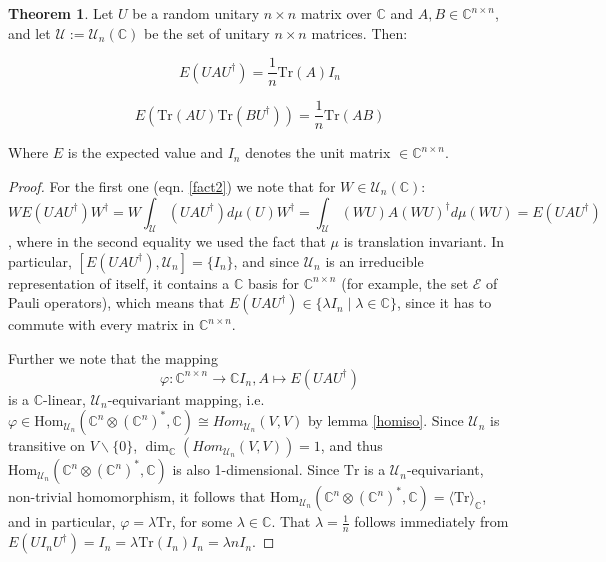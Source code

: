 \documentclass{article}
\def\E{\mathcal{E}}
\def\C{\mathbb{C}}
\def\U{\mathcal{U}}
\def\Hom{\text{Hom}}
\def\Tr{\text{Tr}}
\theoremstyle{definition}
\newtheorem{theorem}[Satz]{Theorem}
\begin{document}
\begin{theorem}
Let $U$ be a random unitary $n \times n$ matrix over $\C$ and $A,B \in \C^{n \times n}$, and let $\U := \U_n(\C)$ be the set of unitary $n \times n$ matrices. Then:

\begin{equation}\label{fact2} %
E(UAU^\dagger) = \frac{1}{n} \Tr(A) I_n
\end{equation}

\begin{equation}\label{fact1}
 E(\Tr(AU)\Tr(BU^\dagger)) = \frac{1}{n} \Tr(AB)
\end{equation}

Where $E$ is the expected value and $I_n$ denotes the unit matrix $\in \C^{n \times n}$.

\begin{proof}

For the first one (eqn. \ref{fact2}) we note that $\text{for }W \in \U_n(\C):$
 \begin{equation}  W E(UAU^{\dagger}) W^\dagger = W \int_{\U} ( U A  U^\dagger) d \mu (U) W^\dagger = \int_{\U} (WU) A (WU)^\dagger d \mu (WU) = E(UAU^\dagger) \end{equation}, where in the second equality we used the fact that $\mu$ is translation invariant.
In particular, $[E(UAU^\dagger), \U_n] = \{ I_n \}$, and since $\U_n$ is an irreducible representation of itself, it contains a $\C$ basis for $\C^{n \times n}$ (for example, the set $\E$ of Pauli operators), which means that $E(UAU^\dagger) \in \{ \lambda I_n \mid \lambda \in \C \}$, since it has to commute with every matrix in $\C^{n \times n}$.

Further we note that the mapping \[ \varphi: \C^{n \times n} \rightarrow \C I_n, A \mapsto E(UAU^\dagger) \] is a $\C$-linear, $\U_n$-equivariant mapping, i.e. $\varphi \in \Hom_{\U_n}(\C^n \otimes (\C^n)^*, \C) \cong Hom_{\U_n}(V,V)$ by lemma \ref{homiso}. Since $\U_n$ is transitive on $V \backslash \{ 0 \}$, $\dim_\C (Hom_{\U_n}(V,V)) = 1$, and thus $\Hom_{\U_n}(\C^n \otimes (\C^n)^*, \C)$ is also 1-dimensional.
Since $\Tr$ is a $\U_n$-equivariant, non-trivial homomorphism, it follows that $\Hom_{\U_n}(\C^n \otimes (\C^n)^*, \C) = \langle \Tr \rangle_\C$, and in particular, $\varphi = \lambda \Tr$, for some $\lambda \in \C$. That $\lambda = \frac 1 n$ follows immediately from $E(U I_n U^\dagger) = I_n = \lambda \Tr(I_n) I_n = \lambda n I_n$.


\end{proof}
\end{theorem}
\end{document}
